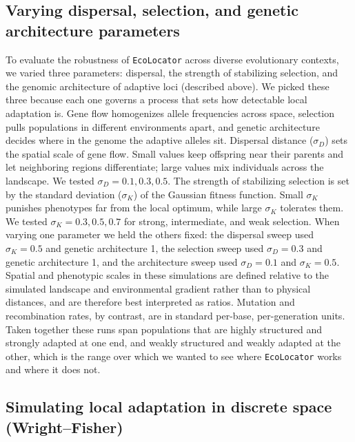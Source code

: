 \documentclass[]{article}
\newcommand{\ecolocator}{\texttt{EcoLocator}\xspace}
\begin{document}
\subsection{Varying dispersal, selection, and genetic architecture parameters}
To evaluate the robustness of \ecolocator
across diverse evolutionary contexts,
we varied three parameters: dispersal,
the strength of stabilizing selection,
and the genomic architecture of adaptive loci (described above).
We picked these three because each one governs
a process that sets how detectable local adaptation is.
Gene flow homogenizes allele frequencies across space,
selection pulls populations in different environments apart,
and genetic architecture decides where in the genome
the adaptive alleles sit.
Dispersal distance (\(\sigma_D\)) sets the spatial scale
of gene flow. Small values keep offspring near their parents
and let neighboring regions differentiate;
large values mix individuals across the landscape.
We tested \(\sigma_D = 0.1, 0.3, 0.5\).
The strength of stabilizing selection is set
by the standard deviation (\(\sigma_K\))
of the Gaussian fitness function.
Small \(\sigma_K\) punishes phenotypes far from the local optimum,
while large \(\sigma_K\) tolerates them.
We tested \(\sigma_K = 0.3, 0.5, 0.7\)
for strong, intermediate, and weak selection.
When varying one parameter we held the others fixed:
the dispersal sweep used \(\sigma_K = 0.5\) and genetic architecture 1,
the selection sweep used \(\sigma_D = 0.3\) and genetic architecture 1,
and the architecture sweep used \(\sigma_D = 0.1\) and \(\sigma_K = 0.5\).
Spatial and phenotypic scales in these simulations are defined relative to the 
simulated landscape and environmental gradient rather than to physical distances,
and are therefore best interpreted as ratios.
Mutation and recombination rates, by contrast, are in standard per-base, per-generation units.
Taken together these runs span populations that are highly structured
and strongly adapted at one end,
and weakly structured and weakly adapted at the other,
which is the range over which we wanted to see
where \ecolocator works and where it does not.

\subsection{Simulating local adaptation in discrete space (Wright--Fisher)}
\end{document}

